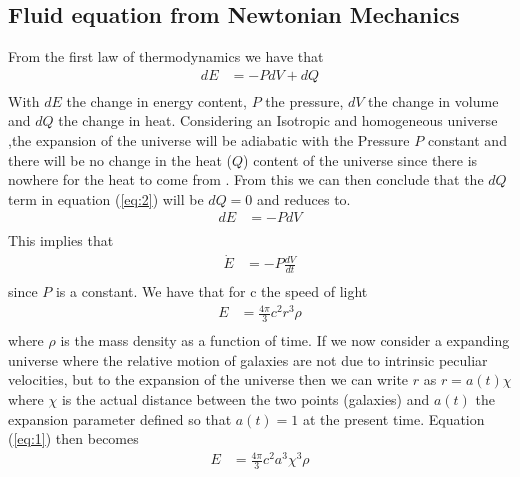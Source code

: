 \documentclass[a4paper, 11pt]{FSKH_623_Report}
\numberwithin{equation}{section}
\newcommand{\driv}[2]{\frac{d #1}{d #2}}
\begin{document}
\subsection{Fluid equation from Newtonian Mechanics}

From the first law of thermodynamics we have that  
\begin{equation}\label{eq:2}
\begin{split}
dE &= -PdV + dQ\\
\end{split}
\end{equation}
With $dE$ the change in energy content, $P$ the pressure, $dV$ the change in volume and $dQ$ the change in heat.
Considering an Isotropic and homogeneous universe \citep{notes4},the expansion of the universe will be adiabatic with the Pressure $P$ constant and there will be no change in the heat ($Q$) content of the universe since there is nowhere for the heat to come from \citep{notes4}. From this we can then conclude that the $dQ$ term in equation (\ref{eq:2}) will be $dQ=0$ and reduces to.
\begin{equation}
\begin{split}
dE &= -PdV \\
\end{split}
\end{equation}
This implies that
\begin{equation}\label{eq:3}
\begin{split}
\dot{E} &= -P\driv{V}{t}             \\
\end{split}
\end{equation}
since $P$ is a constant.
We have that for c the speed of light 
\begin{equation}\label{eq:1}
\begin{split}
E &=\frac{4\pi}{3}c^{2}r^{3}\rho\\
\end{split}
\end{equation}
where $\rho$ is the mass density as a function of time.
If we now consider a expanding universe where the relative motion of galaxies are not due to intrinsic peculiar velocities, but to the expansion of the universe then we can write $r$ as $r=a(t)\chi$ where $\chi$ is the actual distance between the two points (galaxies) and $a(t)$ the expansion parameter defined so that $a(t)=1$ at the present time. Equation (\ref{eq:1}) then becomes
\begin{equation}
\begin{split}
E &=\frac{4\pi}{3}c^{2}a^{3}\chi^{3}\rho\\
\end{split}
\end{equation}
\end{document}
